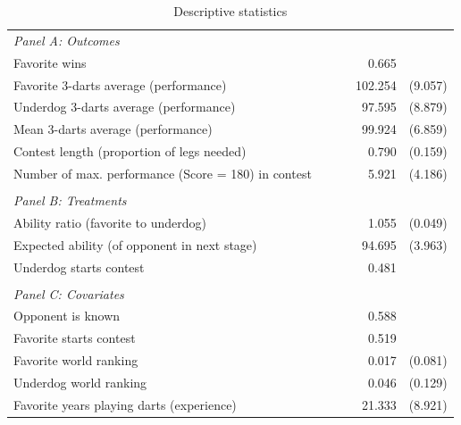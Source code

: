 \documentclass[11pt,a4paper]{article}
\begin{document}
\begin{table}[H]
		\centering
		\caption{Descriptive statistics} 
		\label{tab:table_main_desc}
		\begin{tabular}{l r r r} 
			\toprule \toprule

            \multicolumn{4}{l}{\textit{Panel A: Outcomes}} \vspace{0.7em}        \\ 
			Favorite wins                                & ~~~ &  0.665 &           \\
		    Favorite 3-darts average (performance)       & &  102.254    & (9.057)   \\
		    Underdog 3-darts average (performance)       & &  97.595     & (8.879)   \\
		    Mean 3-darts average (performance)           & &  99.924     & (6.859)   \\ 
            Contest length (proportion of legs needed)   & &  0.790      & (0.159)   \\
            Number of max. performance (Score = 180) in contest & & 5.921 & (4.186)  \\ 
            \vspace{-0.5em}  \\
            \multicolumn{4}{l}{\textit{Panel B: Treatments}} \vspace{0.7em} \\ 
			Ability ratio (favorite to underdog)         & &   1.055     & (0.049)   \\
            Expected ability (of opponent in next stage) & &  94.695     & (3.963)   \\
   			Underdog starts contest                        & &  0.481      &           \\
            \vspace{-0.5em}  \\
            \multicolumn{4}{l}{\textit{Panel C: Covariates}} \vspace{0.7em} \\ 
            Opponent is known                            & & 0.588       &           \\
   			Favorite starts contest                        & &  0.519      &           \\
      		Favorite world ranking                       & &   0.017     & (0.081) \\
         	Underdog world ranking                       & &    0.046    & (0.129) \\
            Favorite years playing darts (experience)    & &  21.333     & (8.921)   \\

\end{tabular}
\end{table}
\end{document}
